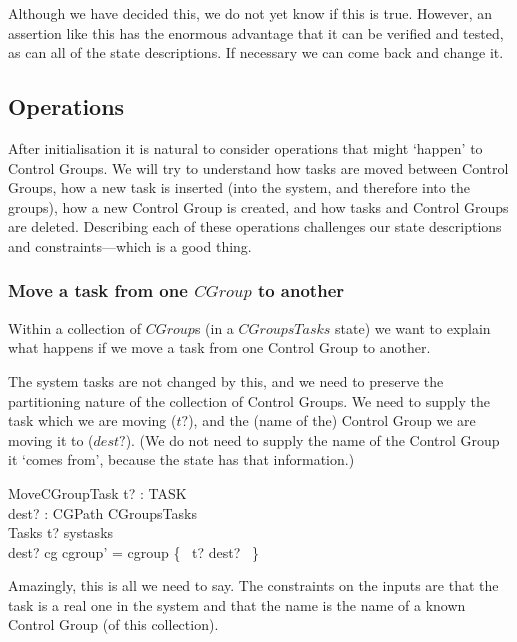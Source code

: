 \documentclass[a4paper,twoside,12pt]{article}
\begin{document}
Although we have decided this, we do not yet know if this is true. However, an assertion like this has the enormous advantage that it can be verified and tested, as can all of the state descriptions. If necessary we can come back and change it.

\subsection{Operations}

After initialisation it is natural to consider operations that might `happen' to Control Groups. We will try to understand how tasks are moved between Control Groups, how a new task is inserted (into the system, and therefore into the groups), how a new Control Group is created, and how tasks and Control Groups are deleted. Describing each of these operations challenges our state descriptions and constraints---which is a good thing.


\subsubsection{Move a task from one $CGroup$ to another}

Within a collection of $CGroup$s (in a $CGroupsTasks$ state) we want to explain what happens if we move a task from one Control Group to another.

The system tasks are not changed by this, and we need to preserve the partitioning nature of the collection of Control Groups. We need to supply the task which we are moving ($t?$), and the (name of the) Control Group we are moving it to ($dest?$). (We do not need to supply the name of the Control Group it `comes from', because the state has that information.)

\begin{schema}{MoveCGroupTask}
t? : TASK \\
dest? : CGPath
\also
\Delta CGroupsTasks \\
\Xi Tasks 
\where
t? \in systasks \\
dest? \in \dom cg
\also
cgroup' = cgroup \oplus \{ ~t? \mapsto dest? ~\}
\end{schema}
Amazingly, this is all we need to say.  The constraints on the inputs are that the task is a real one in the system and that the name is the name of a known Control Group (of this collection).
\end{document}
